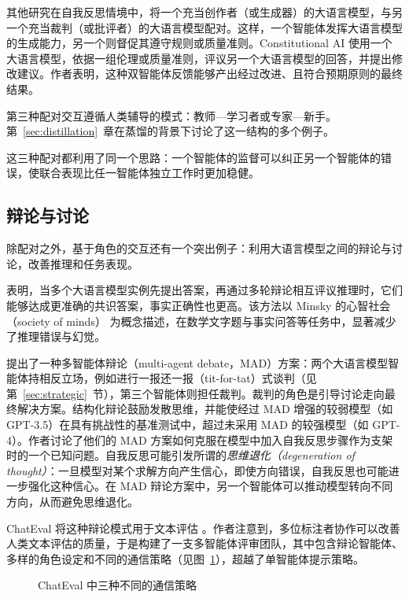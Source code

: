 其他研究在自我反思情境中，将一个充当创作者（或生成器）的大语言模型，与另一个充当裁判（或批评者）的大语言模型配对。这样，一个智能体发挥大语言模型的生成能力，另一个则督促其遵守规则或质量准则。Constitutional AI \citep{bai2022constitutional} 使用一个大语言模型，依据一组伦理或质量准则，评议另一个大语言模型的回答，并提出修改建议。作者表明，这种双智能体反馈能够产出经过改进、且符合预期原则的最终结果。

第三种配对交互遵循人类辅导的模式：教师—学习者或专家—新手。第~\ref{sec:distillation}~章在蒸馏的背景下讨论了这一结构的多个例子。

这三种配对都利用了同一个思路：一个智能体的监督可以纠正另一个智能体的错误，使联合表现比任一智能体独立工作时更加稳健。

\subsection{辩论与讨论}
除配对之外，基于角色的交互还有一个突出例子：利用大语言模型之间的辩论与讨论，改善推理和任务表现。

\citet{du2024debate} 表明，当多个大语言模型实例先提出答案，再通过多轮辩论相互评议推理时，它们能够达成更准确的共识答案，事实正确性也更高。该方法以 Minsky 的心智社会（society of minds）\citep{minsky1988society} 为概念描述，在数学文字题与事实问答等任务中，显著减少了推理错误与幻觉。

\citet{liang-etal-2024-encouraging} 提出了一种多智能体辩论（multi-agent debate，MAD）方案：两个大语言模型智能体持相反立场，例如进行一报还一报（tit-for-tat）式谈判（见第~\ref{sec:strategic}~节），第三个智能体则担任裁判。裁判的角色是引导讨论走向最终解决方案。结构化辩论鼓励发散思维，并能使经过 MAD 增强的较弱模型（如 GPT-3.5）在具有挑战性的基准测试中，超过未采用 MAD 的较强模型（如 GPT-4）。作者讨论了他们的 MAD 方案如何克服在模型中加入自我反思步骤作为支架时的一个已知问题。自我反思可能引发所谓的\emph{思维退化（degeneration of thought）}：一旦模型对某个求解方向产生信心，即使方向错误，自我反思也可能进一步强化这种信心。在 MAD 辩论方案中，另一个智能体可以推动模型转向不同方向，从而避免思维退化。

ChatEval 将这种辩论模式用于文本评估 \citep{chan2023chateval}。作者注意到，多位标注者协作可以改善人类文本评估的质量，于是构建了一支多智能体评审团队，其中包含辩论智能体、多样的角色设定和不同的通信策略（见图~\ref{fig:chateval}），超越了单智能体提示策略。

\begin{figure}
  \begin{center}
    
    \caption{ChatEval 中三种不同的通信策略 \citep{chan2023chateval}}\label{fig:chateval}
  \end{center}
\end{figure}

